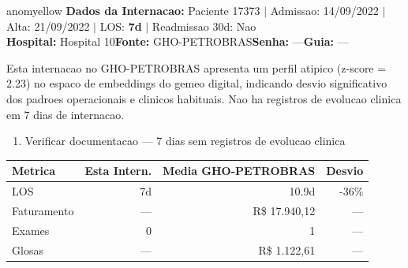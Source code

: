 \documentclass[a4paper,10pt]{article}
\begin{document}
\begin{anomalycard}[Internacao 19447 | GHO-PETROBRAS | MODERADO (z=2.23)]{anomyellow}
\textbf{Dados da Internacao:} Paciente 17373 $\mid$ Admissao: 14/09/2022 $\mid$ Alta: 21/09/2022 $\mid$ LOS: \textbf{7d} $\mid$ Readmissao 30d: Nao\\
\textbf{Hospital:} Hospital 10\quad\textbf{Fonte:} GHO-PETROBRAS\quad\textbf{Senha:} ---\quad\textbf{Guia:} ---\\
\vspace{2pt}\begin{tcolorbox}[colback=severityred!20,colframe=anomyellow,title={\textbf{Interpretacao de Negocio}},fonttitle=\bfseries\small,left=4pt,right=4pt,top=3pt,bottom=3pt]
{\small Esta internacao no GHO-PETROBRAS apresenta um perfil atipico (z-score = 2.23) no espaco de embeddings do gemeo digital, indicando desvio significativo dos padroes operacionais e clinicos habituais. Nao ha registros de evolucao clinica em 7 dias de internacao.}
\end{tcolorbox}
\begin{tcolorbox}[colback=severityyellow!30,colframe=anomorange,title={\textbf{Recomendacoes Especificas}},fonttitle=\bfseries\small,left=4pt,right=4pt,top=3pt,bottom=3pt]
\begin{enumerate}[nosep,leftmargin=16pt]
\item {\small Verificar documentacao --- 7 dias sem registros de evolucao clinica}
\end{enumerate}
\end{tcolorbox}
\begin{center}\begin{tabular}{l r r r}\toprule\textbf{Metrica} & \textbf{Esta Intern.} & \textbf{Media GHO-PETROBRAS} & \textbf{Desvio} \\\midrule
LOS & 7d & 10.9d & -36\% \\
Faturamento & --- & R\$ 17.940,12 & --- \\
Exames & 0 & 1 & --- \\
Glosas & --- & R\$ 1.122,61 & --- \\
\bottomrule\end{tabular}\end{center}


\end{anomalycard}
\end{document}
